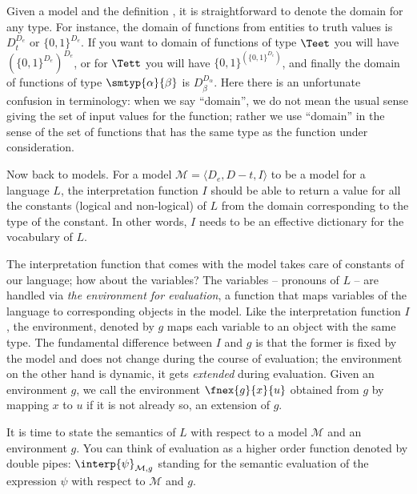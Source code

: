 \documentclass[11pt,a4paper,draft]{article}
\begin{document}
Given a model and the definition , it is straightforward to denote the domain for any type. For instance, the domain of functions from entities to truth values is $D_t^{D_e}$ or $\{0,1\}^{D_e}$. If  you want to domain of functions of type $\Teet$ you will have  $(\{0,1\}^{D_e})^{D_e}$, or for $\Tett$ you will have $\{0,1\}^{(\{0,1\}^{D_e})}$, and finally the domain of functions of type $\smtyp{\alpha}{\beta}$ is $D_{\beta}^{D_{\alpha}}$. Here there is an unfortunate confusion in terminology: when we say ``domain'', we do not mean the usual sense giving the set of input values for the function; rather we use ``domain'' in the sense of the set of functions that has the same type as the function under consideration.

Now back to models. For a model  $\mathcal{M} = \langle D_e, D-t, I \rangle$ to be a model for a language $L$, the interpretation function $I$ should be able to return a value for all the constants (logical and non-logical) of $L$ from the domain corresponding to the type of the constant. In other words, $I$ needs to be an effective dictionary for the vocabulary of $L$. 
 
The interpretation function that comes with the model takes care of constants of our language; how about the variables? The variables -- pronouns of $L$ -- are handled via \emph{the environment for evaluation}, a function that maps variables of the language to corresponding objects in the model. Like the interpretation function $I$, the environment, denoted by $g$ maps each variable to an object with the same type. The fundamental difference between $I$ and $g$ is that the former is fixed by the model and does not change during the course of evaluation; the environment on the other hand is dynamic, it gets \emph{extended} during evaluation. Given an environment $g$, we call the environment $\fnex{g}{x}{u}$ obtained from $g$ by mapping $x$ to $u$ if it is not already so, an extension of $g$. 

It is time to state the semantics of $L$ with respect to a model $\mathcal{M}$ and an environment $g$. You can think of evaluation as a higher order function denoted by double pipes: $\interp{\psi}_{\mathcal{M},g}$ standing for the semantic evaluation of the expression $\psi$ with respect to $\mathcal{M}$ and $g$.
\end{document}
